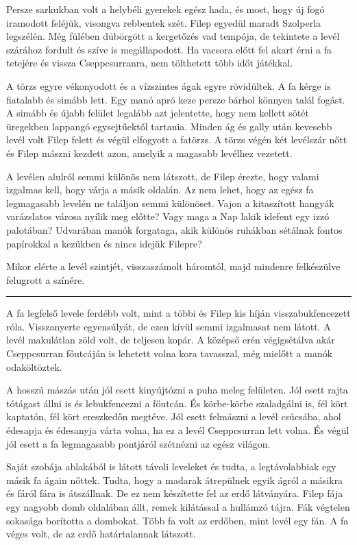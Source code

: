 \documentclass[10pt]{memoir}
\renewcommand{\pfbreakdisplay}{\bigskip \ding{166} \bigskip}
\newcommand{\secbreak}{\fancybreak{\pfbreakdisplay}\indent}
\begin{document}
Persze sarkukban volt a helybéli gyerekek egész hada, és most, hogy új fogó
iramodott feléjük, visongva rebbentek szét. Filep egyedül maradt Szolperla
legszélén. Még fülében dübörgött a kergetőzés vad tempója, de tekintete a levél
szárához fordult és szíve is megállapodott. Ha vacsora előtt fel akart érni a
fa tetejére és vissza Cseppcsurranra, nem tölthetett több időt játékkal.

A törzs egyre vékonyodott és a vízszintes ágak egyre rövidültek. A fa kérge is
fiatalabb és simább lett. Egy manó apró keze persze bárhol könnyen talál
fogást. A simább és újabb felület legalább azt jelentette, hogy nem kellett
sötét üregekben lappangó egysejtűektől tartania. Minden ág és gally után
kevesebb levél volt Filep felett és végül elfogyott a fatörzs. A törzs végén
két levélszár nőtt és Filep mászni kezdett azon, amelyik a magasabb levélhez
vezetett.

A levélen alulról semmi különös nem látszott, de Filep érezte, hogy valami
izgalmas kell, hogy várja a másik oldalán. Az nem lehet, hogy az egész fa
legmagasabb levelén ne találjon semmi különöset. Vajon a kitaszított hangyák
varázslatos városa nyílik meg előtte? Vagy maga a Nap lakik idefent egy izzó
palotában? Udvarában manók forgataga, akik különös ruhákban sétálnak fontos
papírokkal a kezükben és nincs idejük Filepre?

Mikor elérte a levél szintjét, visszaszámolt háromtól, majd mindenre
felkészülve felugrott a színére.

\secbreak

A fa legfelső levele ferdébb volt, mint a többi és Filep kis híján
visszabukfencezett róla. Visszanyerte egyensúlyát, de ezen kívül semmi
izgalmasat nem látott. A levél makulátlan zöld volt, de teljesen kopár. A
középső erén végigsétálva akár Cseppcsurran főutcáján is lehetett volna kora
tavasszal, még mielőtt a manók odaköltöztek.

A hosszú mászás után jól esett kinyújtózni a puha meleg felületen. Jól esett
rajta tótágast állni is és lebukfencezni a főutcán. És körbe-körbe szaladgálni
is, fél kört kaptatón, fél kört ereszkedőn megtéve. Jól esett felmászni a levél
csúcsába, ahol édesapja és édesanyja várta volna, ha ez a levél Cseppcsurran
lett volna. És végül jól esett a fa legmagasabb pontjáról szétnézni az egész
világon.

Saját szobája ablakából is látott távoli leveleket és tudta, a legtávolabbiak
egy másik fa ágain nőttek. Tudta, hogy a madarak átrepülnek egyik ágról a
másikra és fáról fára is átszállnak. De ez nem készítette fel az erdő
látványára. Filep fája egy nagyobb domb oldalában állt, remek kilátással a
hullámzó tájra. Fák végtelen sokasága borította a dombokat. Több fa volt az
erdőben, mint levél egy fán. A fa véges volt, de az erdő határtalannak
látszott.
\end{document}
